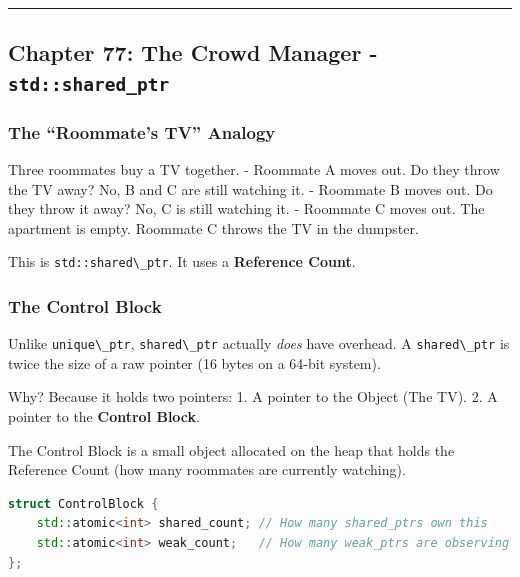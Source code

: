 \begin{center}\rule{0.5\linewidth}{0.5pt}\end{center}

\hypertarget{chapter-77-the-crowd-manager---stdshared_ptr}{%
\subsection{\texorpdfstring{Chapter 77: The Crowd Manager -
\texttt{std::shared\_ptr}}{Chapter 77: The Crowd Manager - std::shared\_ptr}}\label{chapter-77-the-crowd-manager---stdshared_ptr}}

\hypertarget{the-roommates-tv-analogy}{%
\subsubsection{The ``Roommate's TV''
Analogy}\label{the-roommates-tv-analogy}}

Three roommates buy a TV together. - Roommate A moves out. Do they throw
the TV away? No, B and C are still watching it. - Roommate B moves out.
Do they throw it away? No, C is still watching it. - Roommate C moves
out. The apartment is empty. Roommate C throws the TV in the dumpster.

This is \passthrough{\lstinline!std::shared\_ptr!}. It uses a
\textbf{Reference Count}.

\hypertarget{the-control-block}{%
\subsubsection{The Control Block}\label{the-control-block}}

Unlike \passthrough{\lstinline!unique\_ptr!},
\passthrough{\lstinline!shared\_ptr!} actually \emph{does} have
overhead. A \passthrough{\lstinline!shared\_ptr!} is twice the size of a
raw pointer (16 bytes on a 64-bit system).

Why? Because it holds two pointers: 1. A pointer to the Object (The TV).
2. A pointer to the \textbf{Control Block}.

The Control Block is a small object allocated on the heap that holds the
Reference Count (how many roommates are currently watching).

\begin{lstlisting}[language={C++}]
struct ControlBlock {
    std::atomic<int> shared_count; // How many shared_ptrs own this
    std::atomic<int> weak_count;   // How many weak_ptrs are observing
};
\end{lstlisting}

